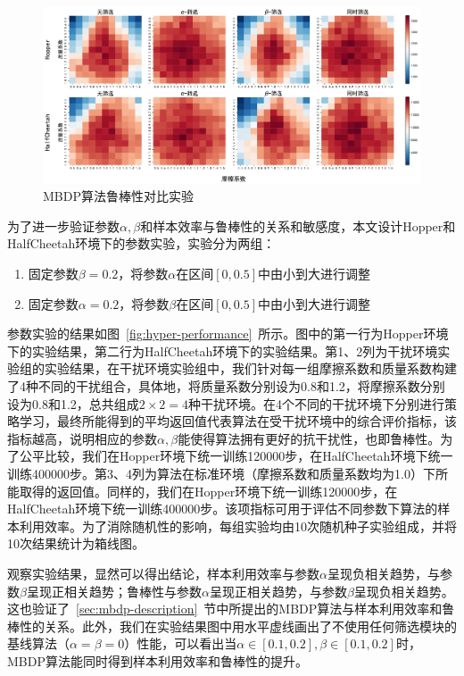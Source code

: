 \begin{figure}[t]
  \centering
  \includegraphics[width=\textwidth]{figures/robustness-heatmap.pdf}
  \caption{MBDP算法鲁棒性对比实验}
  \label{fig:robustness-heatmap}
\end{figure}

为了进一步验证参数$\alpha,\beta$和样本效率与鲁棒性的关系和敏感度，本文设计Hopper和HalfCheetah环境下的参数实验，实验分为两组：

\begin{enumerate}
    \item 固定参数$\beta=0.2$，将参数$\alpha$在区间$[0,0.5]$中由小到大进行调整
    \item 固定参数$\alpha=0.2$，将参数$\beta$在区间$[0,0.5]$中由小到大进行调整
\end{enumerate}

参数实验的结果如图~\ref{fig:hyper-performance}~所示。图中的第一行为Hopper环境下的实验结果，第二行为HalfCheetah环境下的实验结果。第1、2列为干扰环境实验组的实验结果，在干扰环境实验组中，我们针对每一组摩擦系数和质量系数构建了4种不同的干扰组合，具体地，将质量系数分别设为0.8和1.2，将摩擦系数分别设为0.8和1.2，总共组成$2\times 2=4$种干扰环境。在4个不同的干扰环境下分别进行策略学习，最终所能得到的平均返回值代表算法在受干扰环境中的综合评价指标，该指标越高，说明相应的参数$\alpha,\beta$能使得算法拥有更好的抗干扰性，也即鲁棒性。为了公平比较，我们在Hopper环境下统一训练120000步，在HalfCheetah环境下统一训练400000步。第3、4列为算法在标准环境（摩擦系数和质量系数均为1.0）下所能取得的返回值。同样的，我们在Hopper环境下统一训练120000步，在HalfCheetah环境下统一训练400000步。该项指标可用于评估不同参数下算法的样本利用效率。为了消除随机性的影响，每组实验均由10次随机种子实验组成，并将10次结果统计为箱线图。

观察实验结果，显然可以得出结论，样本利用效率与参数$\alpha$呈现负相关趋势，与参数$\beta$呈现正相关趋势；鲁棒性与参数$\alpha$呈现正相关趋势，与参数$\beta$呈现负相关趋势。这也验证了~\ref{sec:mbdp-description}~节中所提出的MBDP算法与样本利用效率和鲁棒性的关系。此外，我们在实验结果图中用水平虚线画出了不使用任何筛选模块的基线算法（$\alpha=\beta=0$）性能，可以看出当$\alpha\in[0.1,0.2],\beta\in[0.1,0.2]$时，MBDP算法能同时得到样本利用效率和鲁棒性的提升。

